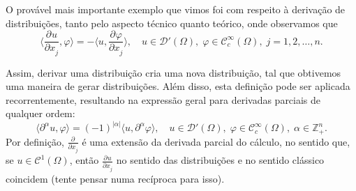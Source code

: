 \documentclass[../distribution_theory_notes.tex]{subfiles}
\begin{document}
          O provável mais importante exemplo que vimos foi com respeito à derivação de distribuições, tanto pelo aspecto técnico quanto teórico, onde observamos que 
            \[
              \biggl\langle \frac{\partial^{}u}{\partial x_{j}^{}}, \varphi  \biggr\rangle =-\biggl\langle u, \frac{\partial^{}\varphi }{\partial x_{j}^{}} \biggr\rangle,\quad u\in \mathcal{D}'(\Omega ),\; \varphi \in \mathcal{C}_{c}^{\infty}(\Omega ),\; j=1,2,\dotsc ,n.
            \]

            Assim, derivar uma distribuição cria uma nova distribuição, tal que obtivemos uma maneira de gerar distribuições. Além disso, esta definição pode ser aplicada recorrentemente, resultando na expressão geral para derivadas parciais de qualquer ordem: 
              \[
                \langle \partial^{\alpha }u, \varphi  \rangle= (-1)^{| \alpha  |}\langle u, \partial^{\alpha }\varphi  \rangle,\quad u\in \mathcal{D}'(\Omega ),\; \varphi\in \mathcal{C}_{c}^{\infty}(\Omega ),\; \alpha \in \mathbb{Z}_{+}^{n}.
              \]
              Por definição, \(\frac{\partial^{}}{\partial x_{j}^{}} \) é uma extensão da derivada parcial do cálculo, no sentido que, se \(u\in \mathcal{C}^{1}(\Omega )\), então \(\frac{\partial^{}u}{\partial x_{j}^{}} \) no sentido das distribuições e no sentido clássico coincidem (tente pensar numa recíproca para isso).
\end{document}

